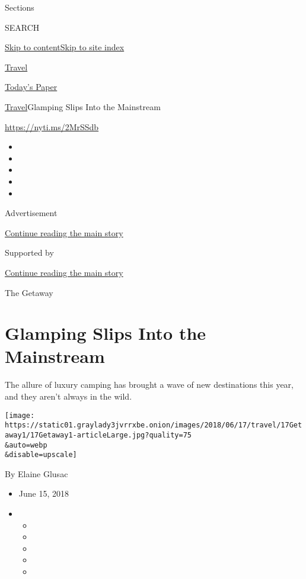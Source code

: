 Sections

SEARCH

\protect\hyperlink{site-content}{Skip to
content}\protect\hyperlink{site-index}{Skip to site index}

\href{https://www.nytimes3xbfgragh.onion/section/travel}{Travel}

\href{https://myaccount.nytimes3xbfgragh.onion/auth/login?response_type=cookie\&client_id=vi}{}

\href{https://www.nytimes3xbfgragh.onion/section/todayspaper}{Today's
Paper}

\href{/section/travel}{Travel}\textbar{}Glamping Slips Into the
Mainstream

\url{https://nyti.ms/2MrSSdb}

\begin{itemize}
\item
\item
\item
\item
\item
\end{itemize}

Advertisement

\protect\hyperlink{after-top}{Continue reading the main story}

Supported by

\protect\hyperlink{after-sponsor}{Continue reading the main story}

The Getaway

\hypertarget{glamping-slips-into-the-mainstream}{%
\section{Glamping Slips Into the
Mainstream}\label{glamping-slips-into-the-mainstream}}

The allure of luxury camping has brought a wave of new destinations this
year, and they aren't always in the wild.

\texttt{[image: https://static01.graylady3jvrrxbe.onion/images/2018/06/17/travel/17Getaway1/17Getaway1-articleLarge.jpg?quality=75\\\&auto=webp\\\&disable=upscale]}

By Elaine Glusac

\begin{itemize}
\item
  June 15, 2018
\item
  \begin{itemize}
  \item
  \item
  \item
  \item
  \item
  \end{itemize}
\end{itemize}

